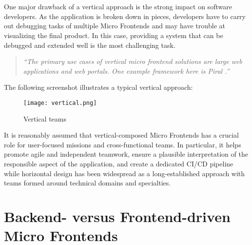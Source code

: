 \documentclass[a4paper]{book}
\begin{document}
\\
\\
One major drawback of a vertical approach is the strong impact on software developers. As the application is broken down in pieces, developers have to carry out debugging tasks of multiple Micro Frontends and may have trouble at visualizing the final product. In this case, providing a system that can be debugged and extended well is the most challenging task. \cite{Rap20}
\begin{quote}
    \textit{“The primary use cases of vertical micro frontend solutions are large web applications and web portals. One example framework here is Piral \cite{Piral}.”} \cite{Rap20}
\end{quote}

The following screenshot illustrates a typical vertical approach:

\begin{figure}[h!]
    \centering
    \captionsetup{justification=centering}
    \texttt{[image: vertical.png]}
    \caption{Vertical teams \cite{Gee20}}
    \label{fig:2}
\end{figure}

It is reasonably assumed that vertical-composed Micro Frontends has a crucial role for user-focused missions and cross-functional teams. In particular, it helps promote agile and independent teamwork, ensure a plausible interpretation of the responsible aspect of the application, and create a dedicated CI/CD pipeline while horizontal design has been widespread as a long-established approach with teams formed around technical domains and specialties.

\section{Backend- versus Frontend-driven Micro Frontends}
\end{document}
